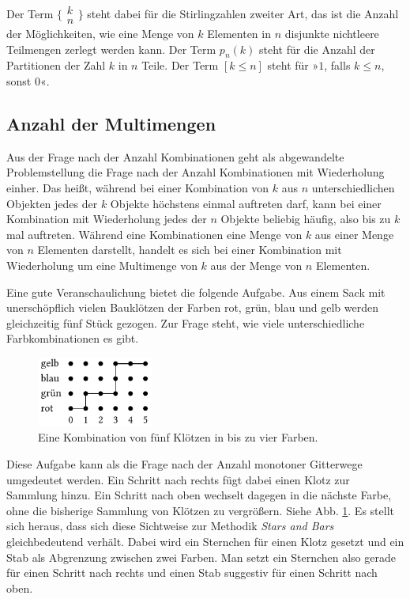 Der Term $\big\{\!\begin{smallmatrix}k\\ n\end{smallmatrix}\!\big\}$
steht dabei für die Stirlingzahlen zweiter Art, das ist die Anzahl der
Möglichkeiten, wie eine Menge von $k$ Elementen in $n$ disjunkte nichtleere
Teilmengen zerlegt werden kann. Der Term $p_n(k)$ steht für die Anzahl
der Partitionen der Zahl $k$ in $n$ Teile. Der Term $[k\le n]$ steht
für »$1$, falls $k\le n$, sonst $0$«.

\subsection{Anzahl der Multimengen}

Aus der Frage nach der Anzahl Kombinationen geht als abgewandelte
Problemstellung die Frage nach der Anzahl Kombinationen mit
Wiederholung einher. Das heißt, während bei einer Kombination von
$k$ aus $n$ unterschiedlichen Objekten jedes der $k$ Objekte höchstens
einmal auftreten darf, kann bei einer Kombination mit Wiederholung
jedes der $n$ Objekte beliebig häufig, also bis zu $k$ mal auftreten.
Während eine Kombinationen eine Menge von $k$ aus einer Menge von $n$
Elementen darstellt, handelt es sich bei einer Kombination mit
Wiederholung um eine Multimenge von $k$ aus der Menge von $n$ Elementen.

Eine gute Veranschaulichung bietet die folgende Aufgabe.
Aus einem Sack mit unerschöpflich vielen Bauklötzen der Farben rot, grün,
blau und gelb werden gleichzeitig fünf Stück gezogen. Zur Frage steht,
wie viele unterschiedliche Farbkombinationen es gibt.

\begin{figure}\setlength{\abovecaptionskip}{0pt}
\begin{center}
\includegraphics[width=38mm]{img/Kloetze.pdf}
\caption{Eine Kombination von fünf Klötzen in bis zu vier Farben.}
\label{fig:Kloetze}
\end{center}
\end{figure}

Diese Aufgabe kann als die Frage nach der Anzahl monotoner Gitterwege
umgedeutet werden. Ein Schritt nach rechts fügt dabei einen Klotz zur
Sammlung hinzu. Ein Schritt nach oben wechselt dagegen in die nächste Farbe,
ohne die bisherige Sammlung von Klötzen zu vergrößern.
Siehe Abb. \ref{fig:Kloetze}. Es stellt sich heraus, dass sich diese Sichtweise
zur Methodik \emph{Stars and Bars} gleichbedeutend verhält. Dabei wird
ein Sternchen für einen Klotz gesetzt und ein Stab als Abgrenzung
zwischen zwei Farben. Man setzt ein Sternchen also gerade für einen
Schritt nach rechts und einen Stab suggestiv für einen Schritt
nach oben.

